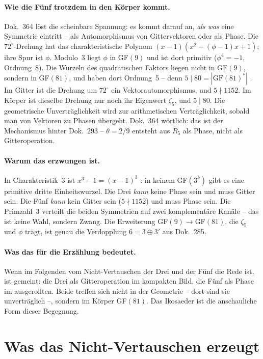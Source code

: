 \paragraph{Wie die Fünf trotzdem in den Körper kommt.}
Dok.~364 löst die scheinbare Spannung: es kommt darauf an, \emph{als was}
eine Symmetrie eintritt -- als Automorphismus von Gittervektoren oder als
Phase. Die $72^\circ$-Drehung hat das charakteristische Polynom
$(x-1)(x^2-(\phi-1)x+1)$; ihre Spur ist $\phi$. Modulo~3 liegt $\phi$ in
GF$(9)$ und ist dort primitiv ($\phi^4=-1$, Ordnung~8). Die Wurzeln des
quadratischen Faktors liegen nicht in GF$(9)$, sondern in GF$(81)$, und haben
dort Ordnung~5 -- denn $5\mid80=|\text{GF}(81)^*|$ \BM. Im Gitter ist die
Drehung um $72^\circ$ ein Vektorautomorphismus, und $5\nmid1152$. Im Körper
ist dieselbe Drehung nur noch ihr Eigenwert $\zeta_5$, und $5\mid80$. Die
geometrische Unverträglichkeit wird zur arithmetischen Verträglichkeit, sobald
man von Vektoren zu Phasen übergeht. Dok.~364 wörtlich: das ist der
Mechanismus hinter Dok.~293 -- $\theta=2/9$ entsteht aus $R_5$ als Phase,
nicht als Gitteroperation.

\paragraph{Warum das erzwungen ist.}
In Charakteristik~3 ist $x^3-1=(x-1)^3$ \EM: in keinem GF$(3^k)$ gibt es eine
primitive dritte Einheitswurzel. Die Drei \emph{kann} keine Phase sein und
muss Gitter sein. Die Fünf \emph{kann} kein Gitter sein ($5\nmid1152$) und
muss Phase sein. Die Primzahl~3 verteilt die beiden Symmetrien auf zwei
komplementäre Kanäle -- das ist keine Wahl, sondern Zwang. Die Erweiterung
GF$(9)\to$GF$(81)$, die $\zeta_5$ und $\phi$ trägt, ist genau die Verdopplung
$6=3\oplus3'$ aus Dok.~285.

\paragraph{Was das für die Erzählung bedeutet.}
Wenn im Folgenden vom Nicht-Vertauschen der Drei und der Fünf die Rede ist,
ist gemeint: die Drei als Gitteroperation im kompakten Bild, die Fünf als
Phase im ausgerollten. Beide treffen sich nicht in der Geometrie -- dort
sind sie unverträglich --, sondern im Körper GF$(81)$. Das Ikosaeder ist die
anschauliche Form dieser Begegnung.

\section{Was das Nicht-Vertauschen erzeugt}


